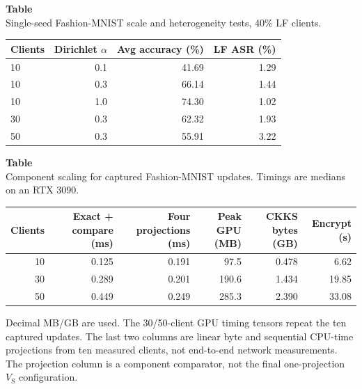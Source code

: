 \noindent\begin{minipage}{\textwidth}
\label{tab:appendix_scale}
\textbf{Table~\thetable}\\
Single-seed Fashion-MNIST scale and heterogeneity tests, 40\% LF clients.
\par\smallskip
\centering\small
\setlength{\tabcolsep}{14pt}
\begin{tabular}{lrrr}
\toprule
Clients & Dirichlet $\alpha$ & Avg accuracy (\%) & LF ASR (\%) \\
\midrule
10 & 0.1 & 41.69 & 1.29 \\
10 & 0.3 & 66.14 & 1.44 \\
10 & 1.0 & 74.30 & 1.02 \\
30 & 0.3 & 62.32 & 1.93 \\
50 & 0.3 & 55.91 & 3.22 \\
\bottomrule
\end{tabular}
\end{minipage}

\noindent\begin{minipage}{\textwidth}
\label{tab:appendix_component_cost}
\textbf{Table~\thetable}\\
Component scaling for captured Fashion-MNIST updates. Timings are medians on an RTX 3090.
\par\smallskip
\centering\small
\setlength{\tabcolsep}{7pt}
\begin{tabular}{rrrrrr}
\toprule
Clients & Exact + compare (ms) & Four projections (ms) & Peak GPU (MB) & CKKS bytes (GB) & Encrypt (s) \\
\midrule
10 & 0.125 & 0.191 & 97.5 & 0.478 & 6.62 \\
30 & 0.289 & 0.201 & 190.6 & 1.434 & 19.85 \\
50 & 0.449 & 0.249 & 285.3 & 2.390 & 33.08 \\
\bottomrule
\end{tabular}
\par\smallskip\footnotesize\raggedright
Decimal MB/GB are used. The 30/50-client GPU timing tensors repeat the ten captured updates. The last two columns are linear byte and sequential CPU-time projections from ten measured clients, not end-to-end network measurements. The projection column is a component comparator, not the final one-projection $V_{\mathrm{S}}$ configuration.
\end{minipage}

